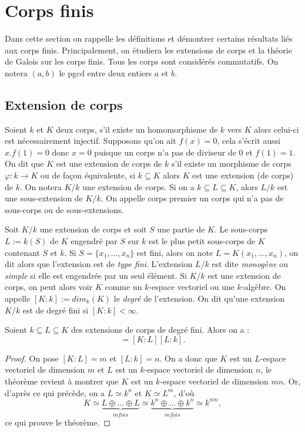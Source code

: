 \documentclass[a4paper]{article} %
\numberwithin{section}{part}
\numberwithin{equation}{section}
\begin{document}
\section{Corps finis}
Dans cette section on rappelle les définitions et démontrer certains 
résultats liés aux corps finis. Principalement, on étudiera les extensions 
de corps et la théorie de Galois sur les corps finis. Tous les corps sont
considérés commutatifs. On notera $(a,b)$ le pgcd entre deux entiers $a$ et $b$.


\subsection{Extension de corps}
\label{def:degext}
Soient $k$ et $K$ deux corps, s'il existe un homomorphisme de $k$ vers $K$ alors
celui-ci est nécessairement injectif. Supposons qu'on ait $f(x) = 0$, cela
s'écrit aussi $x.f(1) = 0$ donc $x = 0$ puisque un corps n'a pas de diviseur de
$0$ et $f(1) = 1$. 
On dit que $K$ est une extension de corps de $k$ s'il existe un morphisme de 
corps $\varphi : k \to K$ ou de façon équivalente, si $k \subseteq K$ alors $K$
est une extension (de corps) de $k$. On notera $K/k$ une extension de corps.
Si on a $k\subseteq L \subseteq K$, alors $L/k$ est une sous-extension de
$K/k$. On appelle corps premier un corps qui n'a pas de sous-corps ou de
sous-extensions.\par
Soit $K/k$ une extension de corps et soit $S$ une partie de $K$. Le sous-corps 
$L := k(S)$ de $K$ engendré par $S$ sur $k$ est le plus petit sous-corps de $K$ 
contenant $S$ et $k$. Si $S = \lbrace x_1,\dots,x_n \rbrace$ est fini, alors on 
note $L = K(x_1,\dots,x_n)$, on dit alors que l'extension est de \emph{type
fini}. L'extension $L/k$ est dite \emph{monogène} ou \emph{simple} si elle est
engendrée par un seul élément. Si $K/k$ est une extension de corps, on peut
alors voir $K$ comme un $k$-espace vectoriel ou une $k$-algèbre. On appelle 
$[K:k] := dim_k(K)$ le \emph{degré} de l'extension. On dit qu'une extension 
$K/k$ est de degré fini si $[K:k] < \infty$.\par

\begin{thm}
Soient $k \subseteq L \subseteq K$ des extensions de corps de degré fini. Alors 
on a :
\begin{equation}
[K:k] = [K:L][L:k].
\end{equation}
\end{thm}
\begin{proof}
On pose $[K:L] = m$ et $[L:k] = n$. On a donc que $K$ est un $L$-espace 
vectoriel de dimension $m$ et $L$ est un $k$-espace vectoriel de dimension $n$, 
le théorème revient à montrer que $K$ est un $k$-espace vectoriel de dimension 
$mn$. Or, d'après ce qui précède, on a $L \simeq k^n$ et $K \simeq L^m$, d'où
\begin{equation}
K \simeq \underbrace{L \oplus\dots\oplus L}_{m fois}\simeq\underbrace
{k^n\oplus\dots\oplus k^n}_{m fois} \simeq k^{nm},
\end{equation}
ce qui prouve le théorème.
\end{proof}
\end{document}
